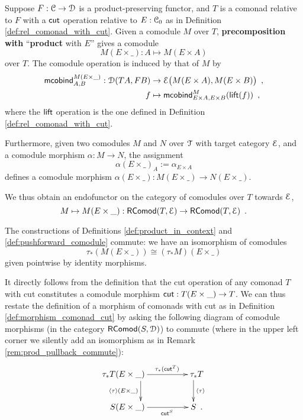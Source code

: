 \documentclass[a4paper,USenglish]{lipics}
\newcommand{\fat}[1]{\textbf{#1}}
\begin{document}
\begin{definition}%
\label{def:product_in_context}
 Suppose $F:{\mathcal{C}}\to\mathcal{D}$ is a product-preserving functor, and $T$ is a comonad relative to $F$ with a $\mathsf{cut}$ operation 
 relative to $E:{\mathcal{C}}_0$ as in Definition \ref{def:rel_comonad_with_cut}.
 Given a comodule $M$ over $T$,  \fat{precomposition with} \enquote{\fat{product} with $E$}
 gives a comodule 
   \[ M(E\times\_) : A \mapsto M(E\times A) \] over $T$.
 The comodule operation is induced by that of $M$ by 
 \begin{align*} \mathsf{mcobind}^{M(E\times\_)}_{A,B} : \mathcal{D}(TA,FB)&\to \mathcal{E}\bigl(M(E\times A), M(E\times B)\bigr) \enspace ,\\ 
                                                      f &\mapsto \mathsf{mcobind}^M_{E\times A,E\times B}(\mathsf{lift}(f)) \enspace ,
  \end{align*}                                        
where the $\mathsf{lift}$ operation is the one defined in Definition \ref{def:rel_comonad_with_cut}.
 
 Furthermore, given two comodules $M$ and $N$ over $\mathcal{T}$ with target category $\mathcal{E}$, and a comodule morphism $\alpha : M \to N$,  
 the assignment \[ \alpha(E \times \_)_A := \alpha_{E\times A} \] defines a comodule morphism 
  $\alpha(E\times \_) : M(E\times \_) \to N(E\times \_) $.

  \noindent
  We thus obtain an endofunctor on the category of comodules over $T$ towards $\mathcal{E}$,
   \[ M \mapsto  M (E\times \_) : \mathsf{RComod}(T,\mathcal{E}) \to \mathsf{RComod}(T,\mathcal{E}) \enspace . \]
\end{definition}



\begin{rem}\label{rem:prod_pullback_commute}
 The constructions of Definitions \ref{def:product_in_context} and \ref{def:pushforward_comodule} commute:
 we have an isomorphism of comodules 
  \[     \tau_*(M(E\times \_)) \cong (\tau_*M)(E \times \_)        \]
 given pointwise by identity morphisms.
\end{rem}



It directly follows from the definition that the cut operation of any comonad $T$ with cut 
constitutes a comodule morphism $\mathsf{cut} : T(E\times \_) \to T$.
We can thus restate the definition of a morphism of comonads with cut as in Definition \ref{def:morphism_comonad_cut} by asking the following diagram 
of comodule morphisms (in the category $\mathsf{RComod}(S,\mathcal{D})$) to commute
(where in the upper left corner we silently add an isomorphism as in Remark \ref{rem:prod_pullback_commute}):
 \[ \begin{xy}
       \xymatrix{  **[l] \tau_*T(E\times \_ )  \ar[r]^{\tau_*(\cut^T)} \ar[d]_{\induced{\tau}(E\times \_)}  &  **[r] \tau_*T \ar[d]^{\induced{\tau}} \\
                   **[l]  S (E\times \_ ) \ar[r]_{\cut^S}  &  **[r] S  \enspace .
        }
      \end{xy}
   \]
\end{document}
